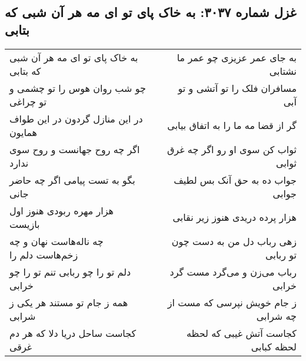 \begin{center}
\section*{غزل شماره ۳۰۳۷: به خاک پای تو ای مه هر آن شبی که بتابی}
\label{sec:3037}
\begin{longtable}{l p{0.5cm} r}
به خاک پای تو ای مه هر آن شبی که بتابی
&&
به جای عمر عزیزی چو عمر ما نشتابی
\\
چو شب روان هوس را تو چشمی و تو چراغی
&&
مسافران فلک را تو آتشی و تو آبی
\\
در این منازل گردون در این طواف همایون
&&
گر از قضا مه ما را به اتفاق بیابی
\\
اگر چه روح جهانست و روح سوی ندارد
&&
ثواب کن سوی او رو اگر چه غرق ثوابی
\\
بگو به تست پیامی اگر چه حاضر جانی
&&
جواب ده به حق آنک بس لطیف جوابی
\\
هزار مهره ربودی هنوز اول بازیست
&&
هزار پرده دریدی هنوز زیر نقابی
\\
چه ناله‌هاست نهان و چه زخم‌هاست دلم را
&&
زهی رباب دل من به دست چون تو ربابی
\\
دلم تو را چو ربابی تنم تو را چو خرابی
&&
رباب می‌زن و می‌گرد مست گرد خرابی
\\
همه ز جام تو مستند هر یکی ز شرابی
&&
ز جام خویش نپرسی که مست از چه شرابی
\\
کجاست ساحل دریا دلا که هر دم غرقی
&&
کجاست آتش غیبی که لحظه لحظه کبابی
\\
\end{longtable}
\end{center}
